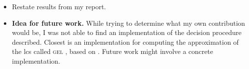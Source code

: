 \documentclass[a4paper,USenglish,cleveref,autoref,thm-restate]{lipics-v2021}
\begin{document}
    \begin{itemize}
        \item Restate results from my report. 
        \item \textbf{Idea for future work.} While trying to determine what my own contribution would be, 
        I was not able to find an implementation of the decision procedure described. Closest is an implementation for 
        computing the approximation of the lcs called \textsc{gel} \cite{gel}, based on \cite{DBLP:conf/esws/PenalozaT11}. Future 
        work might involve a concrete implementation.  
    \end{itemize}



\end{document}
